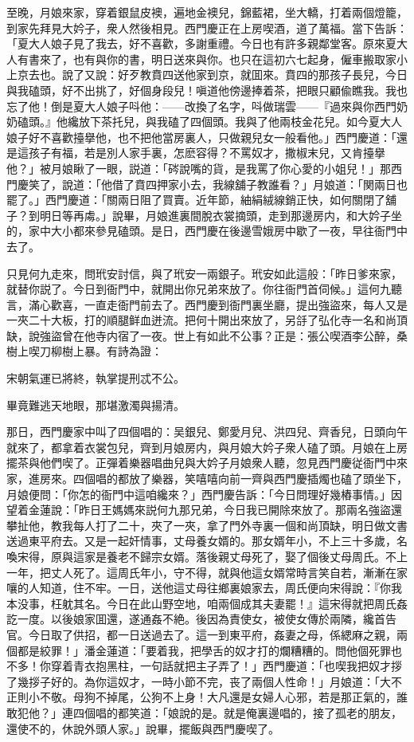 至晚，月娘來家，穿着銀鼠皮襖，遍地金襖兒，錦藍裙，坐大轎，打着兩個燈籠，到家先拜見大妗子，衆人然後相見。西門慶正在上房喫酒，道了萬福。當下告訴：「夏大人娘子見了我去，好不喜歡，多謝重禮。今日也有許多親鄰堂客。原來夏大人有書來了，也有與你的書，明日送來與你。也只在這初六七起身，僱車搬取家小上京去也。說了又說：好歹教賁四送他家到京，就囬來。賁四的那孩子長兒，今日與我磕頭，好不出挑了，好個身段兒！嗔道他傍邊捧着茶，把眼只顧偸瞧我。我也忘了他！倒是夏大人娘子呌他：——改換了名字，呌做瑞雲——『過來與你西門奶奶磕頭。』他纔放下茶托兒，與我磕了四個頭。我與了他兩枝金花兒。如今夏大人娘子好不喜歡擡擧他，也不把他當房裏人，只做親兒女一般看他。」西門慶道：「還是這孩子有福，若是別人家手裏，怎麽容得？不罵奴才，撒椒末兒，又肯擡擧他？」被月娘瞅了一眼，説道：「硶說嘴的貨，是我罵了你心愛的小姐兒！」那西門慶笑了，說道：「他借了賁四押家小去，我線舖子教誰看？」月娘道：「関兩日也罷了。」西門慶道：「關兩日阻了買賣。近年節，紬絹絨線銷正快，如何關閉了舖子？到明日等再䖏。」說畢，月娘進裏間脫衣裳摘頭，走到那邊房内，和大妗子坐的，家中大小都來參見磕頭。是日，西門慶在後邊雪娥房中歇了一夜，早往衙門中去了。

只見何九走來，問玳安討信，與了玳安一兩銀子。玳安如此這般：「昨日爹來家，就替你説了。今日到衙門中，就開出你兄弟來放了。你往衙門首伺候。」這何九聽言，滿心歡喜，一直走衙門前去了。西門慶到衙門裏坐廳，提出強盜來，每人又是一夾二十大板，打的順腿鲜血迸流。把何十開出來放了，另㧱了弘化寺一名和尚頂缺，說強盜曾在他寺内宿了一夜。世上有如此不公事？正是：張公喫酒李公醉，桑樹上喫刀柳樹上暴。有詩為證：

宋朝氣運已將終，執掌提刑忒不公。

畢竟難逃天地眼，那堪激濁與揚清。

那日，西門慶家中叫了四個唱的：吴銀兒、鄭愛月兒、洪四兒、齊香兒，日頭向午就來了，都拿着衣裳包兒，齊到月娘房内，與月娘大妗子衆人磕了頭。月娘在上房擺茶與他們喫了。正彈着樂器唱曲兒與大妗子月娘衆人聽，忽見西門慶従衙門中來家，進房來。四個唱的都放了樂器，笑嘻嘻向前一齊與西門慶插燭也磕了頭坐下，月娘便問：「你怎的衙門中這咱纔來？」西門慶告訴：「今日問理好幾樁事情。」因望着金蓮說：「昨日王媽媽來説何九那兄弟，今日我已開除來放了。那兩名強盜還攀扯他，教我每人打了二十，夾了一夾，拿了門外寺裏一個和尚頂缺，明日做文書送過東平府去。又是一起奸情事，丈母養女婿的。那女婿年小，不上三十多歲，名喚宋得，原與這家是養老不歸宗女婿。落後親丈母死了，娶了個後丈母周氏。不上一年，把丈人死了。這周氏年小，守不得，就與他這女婿常時言笑自若，漸漸在家嚷的人知道，住不牢。一日，送他這丈母往鄉裏娘家去，周氏便向宋得說：『你我本没事，枉躭其名。今日在此山野空地，咱兩個成其夫妻罷！』這宋得就把周氏姦訖一度。以後娘家囬還，遂通姦不絶。後因為責使女，被使女傳於兩隣，纔首告官。今日取了供招，都一日送過去了。這一到東平府，姦妻之母，係緦麻之親，兩個都是絞罪！」潘金蓮道：「要着我，把學舌的奴才打的爛糟糟的。問他個死罪也不多！你穿着青衣抱黑柱，一句話就把主子弄了！」西門慶道：「也喫我把奴才拶了幾拶子好的。為你這奴才，一時小節不完，丧了兩個人性命！」月娘道：「大不正則小不敬。母狗不掉尾，公狗不上身！大凡還是女婦人心邪，若是那正氣的，誰敢犯他？」連四個唱的都笑道：「娘說的是。就是俺裏邊唱的，接了孤老的朋友，還使不的，休說外頭人家。」說畢，擺飯與西門慶喫了。

